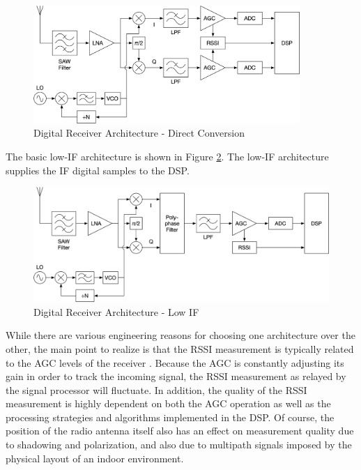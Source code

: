 \documentclass[12pt]{article}
\begin{document}
\begin{figure}[ht]
    \centering
    \includegraphics[width=0.9\textwidth]{RX-Arch-Direct.png}
    \caption{Digital Receiver Architecture - Direct Conversion}
    \label{fig:rx-arch-direct}
\end{figure}

The basic low-IF architecture is shown in Figure \ref{fig:rx-arch-low-if}. The low-IF
architecture supplies the IF digital samples to the DSP.

\begin{figure}[ht]
    \centering
    \includegraphics[width=1.0\textwidth]{RX-Arch-Low-IF.png}
    \caption{Digital Receiver Architecture - Low IF}
    \label{fig:rx-arch-low-if}
\end{figure}

While there are various engineering reasons for choosing one architecture over the other,
the main point to realize is that the RSSI measurement is typically related to the AGC
levels of the receiver  \cite{TIDN505RSSI2010}. Because the AGC is constantly adjusting
its gain in order to track the incoming signal, the RSSI measurement as relayed by the
signal processor will fluctuate. In addition, the quality of the RSSI measurement is
highly dependent on both the AGC operation as well as the processing strategies and
algorithms implemented in the DSP. Of course, the position of the radio antenna itself
also has an effect on measurement quality due to shadowing and polarization, and also due
to multipath signals imposed by the physical layout of an indoor environment.
\end{document}
